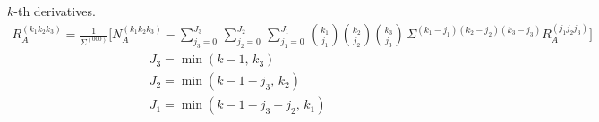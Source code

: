 \documentclass[oneside, english, reqno]{amsart}
\theoremstyle{plain}
\theoremstyle{plain}
\theoremstyle{plain}
\theoremstyle{plain}
\theoremstyle{definition}
\theoremstyle{definition}
\theoremstyle{definition}
\numberwithin{equation}{section}
\begin{document}
\noindent \(k\)-th derivatives.
\begin{align*}
	R_{A}^{(k_{1}k_{2}k_{3})} = \frac{1}{\Sigma^{(000)}}\Biggl[N_{A}^{(k_{1}k_{2}k_{3})} - \sum_{j_{3} = 0}^{J_{3}}\,\sum_{j_{2} = 0}^{J_{2}}\,\sum_{j_{1} = 0}^{J_{1}}\,\binom{k_{1}}{j_{1}}\binom{k_{2}}{j_{2}}\binom{k_{3}}{j_{3}}\,\Sigma^{(k_{1} - j_{1})(k_{2} - j_{2})(k_{3} - j_{3})}R_{A}^{(j_{1}j_{2}j_{3})}\Biggr]
\end{align*}
\begin{align*}
	&J_{3} = \min(k - 1,\,k_{3}) \\[6pt]
	&J_{2} = \min(k - 1 - j_{3},\,k_{2}) \\[6pt]
	&J_{1} = \min(k - 1 - j_{3} - j_{2},\,k_{1})
\end{align*}
\end{document}
